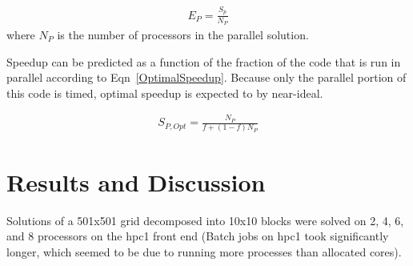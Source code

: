 \documentclass[twocolumn,10pt]{asme2ej}
\begin{document}
\vspace{-1em}
\begin{equation}
\begin{split}
E_P = \frac{S_p}{N_P}
\end{split}
\label{effishEqn}
\end{equation}
\noindent where $N_P$ is the number of processors in the parallel solution.

Speedup can be predicted as a function of the fraction of the code that is run in parallel according to Eqn~\ref{OptimalSpeedup}.  Because only the parallel portion of this code is timed, optimal speedup is expected to by near-ideal.

\vspace{-1em}
\begin{equation}
\begin{split}
S_{P,Opt} = \frac{N_P}{f + (1-f)N_P}
\end{split}
\label{OptimalSpeedup}
\end{equation}




\section{Results and Discussion} \label{results}

Solutions of a 501x501 grid decomposed into 10x10 blocks were solved on 2, 4, 6, and 8 processors on the hpc1 front end (Batch jobs on hpc1 took significantly longer, which seemed to be due to running more processes than allocated cores).
\end{document}
